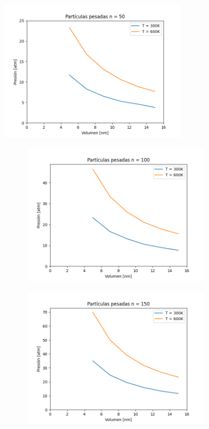 \documentclass[]{article}
\begin{document}
\begin{figure}[h]
    \begin{subfigure}
    \raggedright
     \includegraphics[width=8cm, height=6cm]{grafico1.pdf}
   \caption{\label{fig:ejemplo} mi figura}
    \end{subfigure}
    	\begin{subfigure}
    	  \raggedleft
    	\includegraphics[width=8cm, height=6cm]{grafico2.pdf}
    	\end{subfigure}
   \begin{subfigure}
    	  \centering
    	\includegraphics[width=8cm, height=6cm]{grafico3.pdf}
    	\end{subfigure}
\end{figure}
\end{document}
